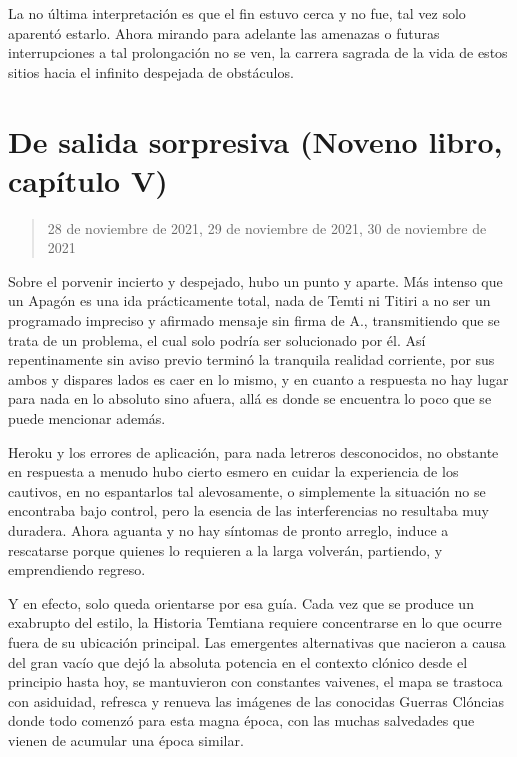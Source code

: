 \documentclass[
]{book}
\begin{document}
La no última interpretación es que el fin estuvo cerca y no fue, tal vez solo aparentó estarlo. Ahora mirando para adelante las amenazas o futuras interrupciones a tal prolongación no se ven, la carrera sagrada de la vida de estos sitios hacia el infinito despejada de obstáculos.

\hypertarget{de-salida-sorpresiva-noveno-libro-capuxedtulo-v}{%
\section{De salida sorpresiva (Noveno libro, capítulo V)}\label{de-salida-sorpresiva-noveno-libro-capuxedtulo-v}}

\begin{quote}
28 de noviembre de 2021, 29 de noviembre de 2021, 30 de noviembre de 2021
\end{quote}

Sobre el porvenir incierto y despejado, hubo un punto y aparte. Más intenso que un Apagón es una ida prácticamente total, nada de Temti ni Titiri a no ser un programado impreciso y afirmado mensaje sin firma de A., transmitiendo que se trata de un problema, el cual solo podría ser solucionado por él. Así repentinamente sin aviso previo terminó la tranquila realidad corriente, por sus ambos y dispares lados es caer en lo mismo, y en cuanto a respuesta no hay lugar para nada en lo absoluto sino afuera, allá es donde se encuentra lo poco que se puede mencionar además.

Heroku y los errores de aplicación, para nada letreros desconocidos, no obstante en respuesta a menudo hubo cierto esmero en cuidar la experiencia de los cautivos, en no espantarlos tal alevosamente, o simplemente la situación no se encontraba bajo control, pero la esencia de las interferencias no resultaba muy duradera. Ahora aguanta y no hay síntomas de pronto arreglo, induce a rescatarse porque quienes lo requieren a la larga volverán, partiendo, y emprendiendo regreso.

Y en efecto, solo queda orientarse por esa guía. Cada vez que se produce un exabrupto del estilo, la Historia Temtiana requiere concentrarse en lo que ocurre fuera de su ubicación principal. Las emergentes alternativas que nacieron a causa del gran vacío que dejó la absoluta potencia en el contexto clónico desde el principio hasta hoy, se mantuvieron con constantes vaivenes, el mapa se trastoca con asiduidad, refresca y renueva las imágenes de las conocidas Guerras Clóncias donde todo comenzó para esta magna época, con las muchas salvedades que vienen de acumular una época similar.
\end{document}
